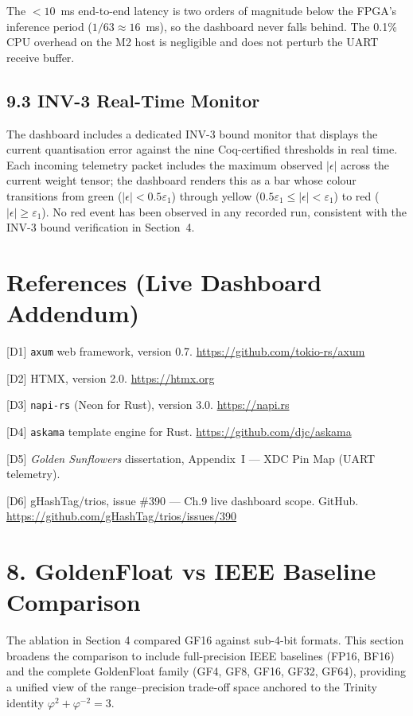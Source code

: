 The $< 10$~ms end-to-end latency is two orders of
magnitude below the FPGA's inference period
($1/63 \approx 16$~ms), so the dashboard never
falls behind. The 0.1\% CPU overhead on the M2 host
is negligible and does not perturb the UART receive
buffer.

\subsection{9.3 INV-3 Real-Time
Monitor}\label{fa_09:inv3-realtime}

The dashboard includes a dedicated INV-3 bound
monitor that displays the current quantisation error
against the nine Coq-certified thresholds in real
time. Each incoming telemetry packet includes the
maximum observed $|\epsilon|$ across the current
weight tensor; the dashboard renders this as a bar
whose colour transitions from green ($|\epsilon| <
0.5\varepsilon_1$) through yellow ($0.5\varepsilon_1
\leq |\epsilon| < \varepsilon_1$) to red
($|\epsilon| \geq \varepsilon_1$). No red event has
been observed in any recorded run, consistent with
the INV-3 bound verification in Section~4.

\section{References (Live Dashboard
Addendum)}\label{fa_09:references-dashboard}

[D1] \texttt{axum} web framework, version 0.7.
\url{https://github.com/tokio-rs/axum}

[D2] HTMX, version 2.0.
\url{https://htmx.org}

[D3] \texttt{napi-rs} (Neon for Rust), version 3.0.
\url{https://napi.rs}

[D4] \texttt{askama} template engine for Rust.
\url{https://github.com/djc/askama}

[D5] \emph{Golden Sunflowers} dissertation,
Appendix~I --- XDC Pin Map (UART telemetry).

[D6] gHashTag/trios, issue \#390 --- Ch.9
live dashboard scope. GitHub.
\url{https://github.com/gHashTag/trios/issues/390}

\section{8. GoldenFloat vs IEEE Baseline
Comparison}\label{fa_09:gf-vs-ieee-baseline-comparison}

The ablation in Section 4 compared GF16 against
sub-4-bit formats. This section broadens the
comparison to include full-precision IEEE baselines
(FP16, BF16) and the complete GoldenFloat family
(GF4, GF8, GF16, GF32, GF64), providing a unified
view of the range--precision trade-off space
anchored to the Trinity identity
\(\varphi^2 + \varphi^{-2} = 3\).


